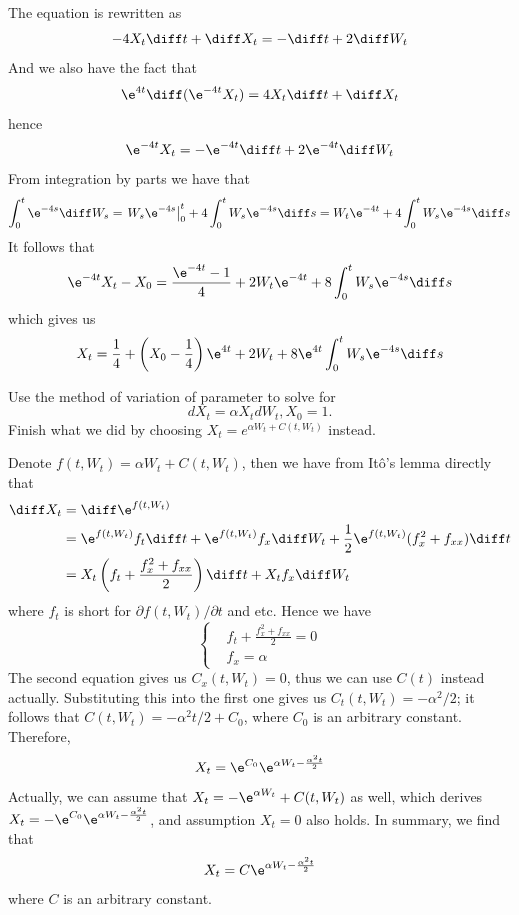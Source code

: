 \begin{subproblem}[(3.\arabic*)]
        \item
        The equation is rewritten as
        \[-4X_t\diff t+\diff X_t=-\diff t+2\diff W_t\]
        And we also have the fact that
        \[\e^{4t}\diff(\e^{-4t}X_t)=4X_t\diff t+\diff X_t\]
        hence
        \[\e^{-4t}X_t=-\e^{-4t}\diff t+2\e^{-4t}\diff W_t\]
        From integration by parts we have that
        \[\int_0^t\e^{-4s}\diff W_s=\left.W_s\e^{-4s}\right|_0^t
        +4\int_0^tW_s\e^{-4s}\diff s
        =W_t\e^{-4t}+4\int_0^tW_s\e^{-4s}\diff s\]
        It follows that
        \[\e^{-4t}X_t-X_0=\frac{\e^{-4t}-1}{4}+2W_t\e^{-4t}+8\int_0^tW_s\e^{-4s}\diff s\]
        which gives us
        \[X_t=\frac{1}{4}+\left(X_0-\frac{1}{4}\right)\e^{4t}+2W_t
        +8\e^{4t}\int_0^tW_s\e^{-4s}\diff s\]

    \end{subproblem}

    \problem
    \begin{question}
        Use the method of variation of parameter to solve for
        \[dX_t=\alpha X_t dW_t, X_0=1.\]
        Finish what we did by choosing $X_t=e^{\alpha W_t+C(t,W_t)}$ instead.
    \end{question}
    Denote $f(t,W_t)=\alpha W_t+C(t,W_t)$, then we have from
    It\^o's lemma directly that
    \[\begin{aligned}
        \diff X_t&=\diff \e^{f(t,W_t)}\\
        &=\e^{f(t,W_t)}f_t\diff t+\e^{f(t,W_t)}f_x\diff W_t
        +\frac{1}{2}\e^{f(t,W_t)}(f_x^2+f_{xx})\diff t\\
        &=X_t\left(f_t+\frac{f_x^2+f_{xx}}{2}\right)\diff t
        +X_tf_x\diff W_t
    \end{aligned}\]
    where $f_t$ is short for $\partial f(t,W_t)/\partial t$ and etc.
    Hence we have
    \[\left\{\begin{aligned}
        &f_t+\frac{f_x^2+f_{xx}}{2}=0\\
        &f_x=\alpha
    \end{aligned}\right.\]
    The second equation gives us $C_x(t,W_t)=0$, thus we can use $C(t)$
    instead actually. Substituting this into the first one gives us
    $C_t(t,W_t)=-\alpha^2/2$; it follows that $C(t,W_t)=-\alpha^2 t/2+C_0$,
    where $C_0$ is an arbitrary constant.
    Therefore,
    \[X_t=\e^{C_0}\e^{\alpha W_t-\frac{\alpha^2t}{2}}\]
    Actually, we can assume that $X_t=-\e^{\alpha W_t}+C(t,W_t)$ as well,
    which derives $X_t=-\e^{C_0}\e^{\alpha W_t-\frac{\alpha^2t}{2}}$,
    and assumption $X_t=0$ also holds. In summary, we find that
    \[X_t=C\e^{\alpha W_t-\frac{\alpha^2t}{2}}\]
    where $C$ is an arbitrary constant.

